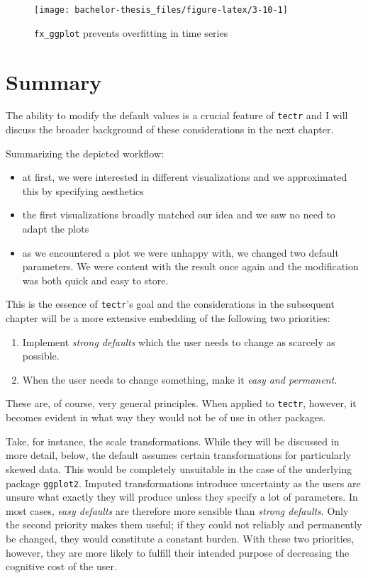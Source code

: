 \documentclass[]{report}
\theoremstyle{definition}
\theoremstyle{definition}
\theoremstyle{definition}
\theoremstyle{remark}
\begin{document}
\begin{figure}

{\centering \texttt{[image: bachelor-thesis\_files/figure-latex/3-10-1]} 

}

\caption{\texttt{fx\_ggplot} prevents overfitting in time series}\label{fig:3-10}
\end{figure}



\hypertarget{summary}{\section{Summary}\label{summary}}

The ability to modify the default values is a crucial feature of
\texttt{tectr} and I will discuss the broader background of these
considerations in the next chapter.

Summarizing the depicted workflow:

\begin{itemize}
\item
  at first, we were interested in different visualizations and we
  approximated this by specifying aesthetics
\item
  the first visualizations broadly matched our idea and we saw no need
  to adapt the plots
\item
  as we encountered a plot we were unhappy with, we changed two default
  parameters. We were content with the result once again and the
  modification was both quick and easy to store.
\end{itemize}

This is the essence of \texttt{tectr}'s goal and the considerations in
the subsequent chapter will be a more extensive embedding of the
following two priorities:

\begin{enumerate}
\def\labelenumi{\arabic{enumi}.}
\item
  Implement \emph{strong defaults} which the user needs to change as
  scarcely as possible.
\item
  When the user needs to change something, make it \emph{easy and
  permanent}.
\end{enumerate}

These are, of course, very general principles. When applied to
\texttt{tectr}, however, it becomes evident in what way they would not
be of use in other packages.

Take, for instance, the scale transformations. While they will be
discussed in more detail, below, the default assumes certain
transformations for particularly skewed data. This would be completely
unsuitable in the case of the underlying package \texttt{ggplot2}.
Imputed transformations introduce uncertainty as the users are unsure
what exactly they will produce unless they specify a lot of parameters.
In most cases, \emph{easy defaults} are therefore more sensible than
\emph{strong defaults}. Only the second priority makes them useful; if
they could not reliably and permanently be changed, they would
constitute a constant burden. With these two priorities, however, they
are more likely to fulfill their intended purpose of decreasing the
cognitive cost of the user.
\end{document}
